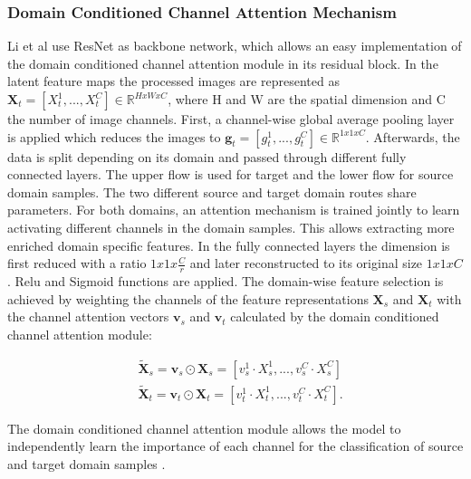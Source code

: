 \subsubsection{Domain Conditioned Channel Attention Mechanism}
Li et al \cite{li2020} use ResNet as backbone network, which allows an easy implementation of the domain conditioned channel attention module in its residual block. In the latent feature maps the processed images are represented as $\pmb{X}_{t} = [X^{1}_{t},...,X^{C}_{t}] \in \mathbb{R}^{HxWxC}$, where H and W are the spatial dimension and C the number of image channels. First, a channel-wise global average pooling layer is applied which reduces the images to  $\pmb{g}_{t} = [g^{1}_{t},...,g^{C}_{t}] \in \mathbb{R}^{1x1xC}$. Afterwards, the data is split depending on its domain and passed through different fully connected layers. The upper flow is used for target and the lower flow for source domain samples. The two different source and target domain routes share parameters. For both domains, an attention mechanism is trained jointly to learn activating different channels in the domain samples. This allows extracting more enriched domain specific features. In the fully connected layers the dimension is first reduced with a ratio ${1x1x\frac{C}{r}}$ and later reconstructed to its original size ${1x1xC}$. Relu and Sigmoid functions are applied. The domain-wise feature selection is achieved by weighting the channels of the feature representations $\pmb{X}_{s}$ and $\pmb{X}_{t}$ with the channel attention vectors $\pmb{v}_{s}$ and $\pmb{v}_{t}$ calculated by the domain conditioned channel attention module:

\begin{equation}
    \begin{aligned}
        &\pmb{\tilde{X}}_{s} = \pmb{v}_{s} \odot \pmb{X}_{s} = [v_{s}^{1} \cdot X_{s}^{1}, ..., v_{s}^{C} \cdot X_{s}^{C}]\\
        &\pmb{\tilde{X}}_{t} = \pmb{v}_{t} \odot \pmb{X}_{t} = [v_{t}^{1} \cdot X_{t}^{1}, ..., v_{t}^{C} \cdot X_{t}^{C}].
    \end{aligned}
\end{equation}

The domain conditioned channel attention module allows the model to independently learn the importance of each channel for the classification of source and target domain samples \cite{li2020}.


